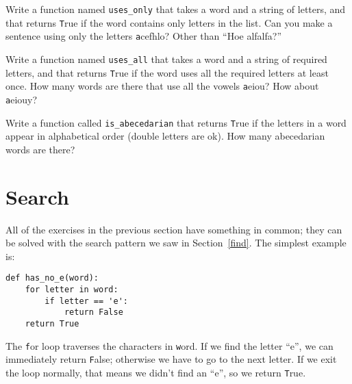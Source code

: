 \documentclass[
DIV=11,
fontsize=13,
twoside,
headinclude=false,
titlepage=firstiscover,
abstract=true,
headsepline=true,
footsepline=true,
chapterprefix=true, %
headings=big,
bibliography=totoc,%
captions=tableheading
]{scrbook}
\theoremstyle{definition}
\begin{document}
\begin{exercise}
\normalfont

Write a function named \verb"uses_only" that takes a word and a
string of letters, and that returns {\texttt True} if the word contains
only letters in the list.  Can you make a sentence using only the
letters {\texttt acefhlo}?  Other than ``Hoe alfalfa?''

\end{exercise}


\begin{exercise}
\normalfont 

Write a function named \verb"uses_all" that takes a word and a
string of required letters, and that returns {\texttt True} if the word
uses all the required letters at least once.  How many words are there
that use all the vowels {\texttt aeiou}?  How about {\texttt aeiouy}?

\end{exercise}


\begin{exercise}
\normalfont

Write a function called \verb"is_abecedarian" that returns
{\texttt True} if the letters in a word appear in alphabetical order
(double letters are ok).  
How many abecedarian words are there?


\end{exercise}



\section{Search}
\label{search}

All of the exercises in the previous section have something
in common; they can be solved with the search pattern we saw
in Section~\ref{find}.  The simplest example is:

\begin{lstlisting}
def has_no_e(word):
    for letter in word:
        if letter == 'e':
            return False
    return True
\end{lstlisting}
%
The {\texttt for} loop traverses the characters in {\texttt word}.  If we find
the letter ``e'', we can immediately return {\texttt False}; otherwise we
have to go to the next letter.  If we exit the loop normally, that
means we didn't find an ``e'', so we return {\texttt True}.
\end{document}
